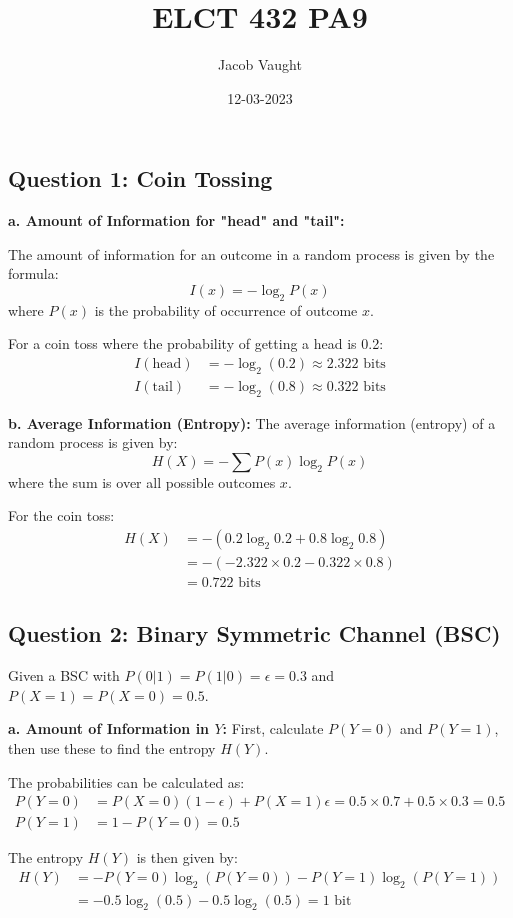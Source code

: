 \documentclass{article}
\title{ELCT 432 PA9}
\author{Jacob Vaught}
\date{12-03-2023}
\begin{document}
\maketitle

\subsection*{Question 1: Coin Tossing}
\textbf{a. Amount of Information for "head" and "tail":}

The amount of information for an outcome in a random process is given by the formula:
\[ I(x) = -\log_2 P(x) \]
where \( P(x) \) is the probability of occurrence of outcome \( x \).

For a coin toss where the probability of getting a head is 0.2:
\begin{align*}
    I(\text{head}) &= -\log_2(0.2) \approx 2.322 \text{ bits} \\
    I(\text{tail}) &= -\log_2(0.8) \approx 0.322 \text{ bits}
\end{align*}

\textbf{b. Average Information (Entropy):}
The average information (entropy) of a random process is given by:
\[ H(X) = -\sum P(x) \log_2 P(x) \]
where the sum is over all possible outcomes \( x \).

For the coin toss:
\begin{align*}
    H(X) &= -(0.2 \log_2 0.2 + 0.8 \log_2 0.8) \\
    &= -(-2.322 \times 0.2 - 0.322 \times 0.8) \\
    &= 0.722 \text{ bits}
\end{align*}
\subsection*{Question 2: Binary Symmetric Channel (BSC)}
Given a BSC with \( P(0|1) = P(1|0) = \epsilon = 0.3 \) and \( P(X=1) = P(X=0) = 0.5 \).

\textbf{a. Amount of Information in \( Y \):}
First, calculate \( P(Y=0) \) and \( P(Y=1) \), then use these to find the entropy \( H(Y) \).

The probabilities can be calculated as:
\begin{align*}
    P(Y=0) &= P(X=0)(1 - \epsilon) + P(X=1)\epsilon = 0.5 \times 0.7 + 0.5 \times 0.3 = 0.5 \\
    P(Y=1) &= 1 - P(Y=0) = 0.5
\end{align*}

The entropy \( H(Y) \) is then given by:
\begin{align*}
    H(Y) &= -P(Y=0)\log_2(P(Y=0)) - P(Y=1)\log_2(P(Y=1)) \\
    &= -0.5 \log_2(0.5) - 0.5 \log_2(0.5) = 1 \text{ bit}
\end{align*}
\end{document}
